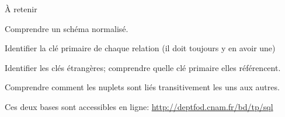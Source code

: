 \begin{frame}{À retenir}

Comprendre un schéma normalisé.

\vfill
\begin{redbullet}
  \item Identifier la clé primaire de chaque relation (il doit \alert{toujours} y en avoir une)
 \item Identifier les clés étrangères; comprendre quelle clé primaire elles référencent.
 \item Comprendre comment les nuplets sont liés transitivement les uns aux autres.
\end{redbullet}

\vfill

Ces deux bases sont accessibles en ligne: \url{http://deptfod.cnam.fr/bd/tp/sql}
\end{frame}

